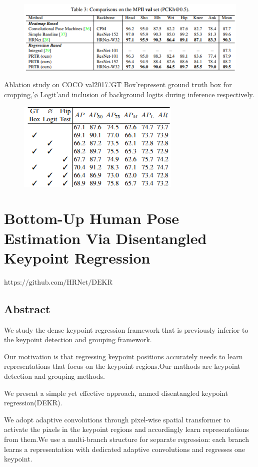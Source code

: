 \documentclass[11pt]{article}
\begin{document}
\begin{figure}[H]
	\centering
	\includegraphics[scale = 0.6]{34}
\end{figure}

Ablation study on COCO val2017.'GT Box'represent ground truth box for cropping,'$\text{\o}$ Logit'and inclusion of background logits during inference respectively.
\begin{figure}[H]
	\centering
	\includegraphics[scale = 0.6]{35}
\end{figure}
\section{Bottom-Up Human Pose Estimation Via Disentangled Keypoint Regression}
$\text{https://github.com/HRNet/DEKR}$
\subsection{Abstract}
We study the dense keypoint regression framework that is previously inferior to the keypoint detection and grouping framework. 

Our motivation is that regressing keypoint positions accurately needs to learn representations that focus on the keypoint regions.Our mathods are keypoint detection and grouping methods.

We present a simple yet effective approach, named disentangled keypoint regression(DEKR).

We adopt adaptive convolutions through pixel-wise spatial transformer to activate the pixels in the keypoint regions and accordingly learn representations from them.We use a multi-branch structure for separate regression: each branch learns a representation with dedicated adaptive convolutions and regresses one keypoint.
\end{document}
